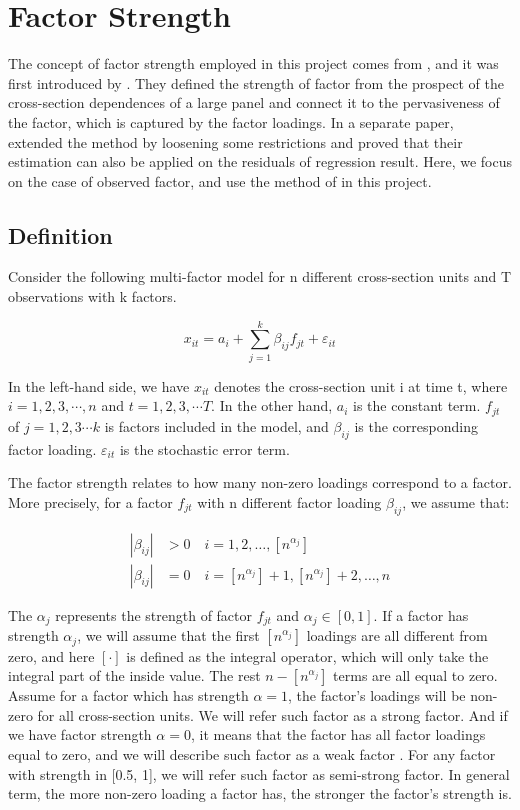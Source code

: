 \chapter{Factor Strength}\label{strength}
The concept of factor strength employed in this project comes from , and it was first introduced by .
They defined the strength of factor from the prospect of the cross-section dependences of a large panel and connect it to the pervasiveness of the factor, which is captured by the factor loadings.
In a separate paper,  extended the method by loosening some restrictions and proved that their estimation can also be applied on the residuals of regression result.
Here, we focus on the case of observed factor, and use the method of  in this project.

\section{Definition}\label{strength_definiton}

Consider the following multi-factor model for n different cross-section units and T observations with k  factors.

\[  x_{it} = a_{i}+  \sum_{j=1}^{k}\beta_{ij}f_{jt} + \varepsilon_{it} \tag{1}\label{definition_model} \]

In the left-hand side, we have $x_{it}$ denotes the cross-section unit i at time t, where $i = 1, 2,3, \cdots, n$ and $t = 1,2,3, \cdots T$.  
In the other hand, $a_{i}$ is the constant term.
$f_{jt}$ of $j = 1, 2, 3\cdots k$ is factors included in the model, and $\beta_{ij}$ is the corresponding factor loading.
$\varepsilon_{it}$ is the stochastic error term.

The factor strength relates to how many non-zero loadings correspond to a factor.
More precisely, for a factor $f_{jt}$ with n different factor loading $\beta_{ij}$, we assume that:

\begin{align*}
|\beta_{ij}| &> 0\quad i = 1, 2,  \dots, [n^{\alpha_j}]\\
|\beta_{ij}| &= 0 \quad i = [n^{\alpha_j}] + 1, [n^{\alpha_j}] +2 ,\dots, n
\end{align*}

The $\alpha_j$ represents the strength of factor $f_{jt}$ and $\alpha_j \in [0,1]$.
If a factor has strength $\alpha_j$, we will assume that the first $[n^{\alpha_j}]$ loadings are all different from zero, and here $[\cdot] $  is defined as the integral operator, which will only take the integral part of the inside value.
The rest $n - [n^{\alpha_j}]$ terms are all equal to zero. 
Assume for a factor which has strength $\alpha = 1$, the factor's loadings will be non-zero for all cross-section units.
We will refer such factor as a strong factor.
And if we have factor strength $\alpha = 0$, it means that the factor has all factor loadings equal to zero, and we will describe such factor as a weak factor \cite{Bailey2016}.
For any factor with strength in [0.5, 1], we will refer such factor as semi-strong factor.
In general term, the more non-zero loading a factor has, the stronger the factor's strength is. 

